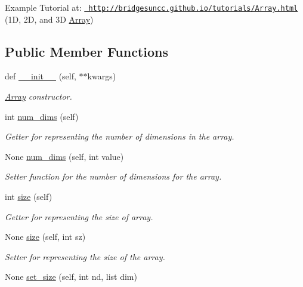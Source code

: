 Example Tutorial at\+: \href{http://bridgesuncc.github.io/tutorials/Array.html}{\texttt{ http\+://bridgesuncc.\+github.\+io/tutorials/\+Array.\+html}} (1D, 2D, and 3D \mbox{\hyperlink{classbridges_1_1array_1_1_array}{Array}}) \subsection*{Public Member Functions}
\begin{DoxyCompactItemize}
\item 
def \mbox{\hyperlink{classbridges_1_1array_1_1_array_a84c1237ed71850f141cd0cac5a8f77c3}{\+\_\+\+\_\+init\+\_\+\+\_\+}} (self, $\ast$$\ast$kwargs)
\begin{DoxyCompactList}\small\item\em \mbox{\hyperlink{classbridges_1_1array_1_1_array}{Array}} constructor. \end{DoxyCompactList}\item 
int \mbox{\hyperlink{classbridges_1_1array_1_1_array_a4d7ea01781326e1b07a297f54ddcba2d}{num\+\_\+dims}} (self)
\begin{DoxyCompactList}\small\item\em Getter for representing the number of dimensions in the array. \end{DoxyCompactList}\item 
None \mbox{\hyperlink{classbridges_1_1array_1_1_array_afea12a8b38ac62d46413e557c3c1d89d}{num\+\_\+dims}} (self, int value)
\begin{DoxyCompactList}\small\item\em Setter function for the number of dimensions for the array. \end{DoxyCompactList}\item 
int \mbox{\hyperlink{classbridges_1_1array_1_1_array_a479be9c2ec7aace6db3bec8b48a53ac7}{size}} (self)
\begin{DoxyCompactList}\small\item\em Getter for representing the size of array. \end{DoxyCompactList}\item 
None \mbox{\hyperlink{classbridges_1_1array_1_1_array_a50f6b3cf7794221428038cc84f868e25}{size}} (self, int sz)
\begin{DoxyCompactList}\small\item\em Setter for representing the size of the array. \end{DoxyCompactList}\item 
None \mbox{\hyperlink{classbridges_1_1array_1_1_array_aa503ee9a06a60ddf8acb9e5dc49c820a}{set\+\_\+size}} (self, int nd, list dim)
$$
\end{DoxyCompactItemize}
